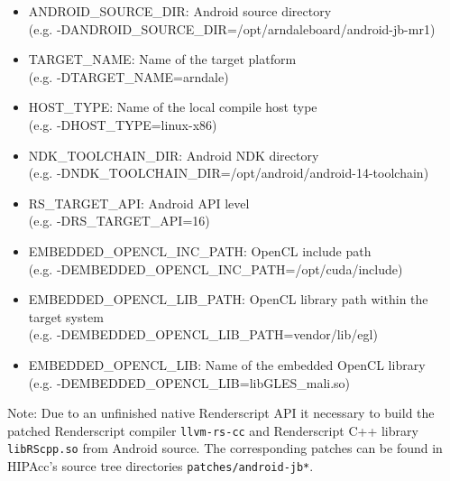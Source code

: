 \begin{itemize}
    \item ANDROID\_SOURCE\_DIR:         Android source directory\\(e.g. -DANDROID\_SOURCE\_DIR=/opt/arndaleboard/android-jb-mr1)
    \item TARGET\_NAME:                 Name of the target platform\\(e.g. -DTARGET\_NAME=arndale)
    \item HOST\_TYPE:                   Name of the local compile host type\\(e.g. -DHOST\_TYPE=linux-x86)
    \item NDK\_TOOLCHAIN\_DIR:          Android NDK directory\\(e.g. -DNDK\_TOOLCHAIN\_DIR=/opt/android/android-14-toolchain)
    \item RS\_TARGET\_API:              Android API level\\(e.g. -DRS\_TARGET\_API=16)
    \item EMBEDDED\_OPENCL\_INC\_PATH:  OpenCL include path\\(e.g. -DEMBEDDED\_OPENCL\_INC\_PATH=/opt/cuda/include)
    \item EMBEDDED\_OPENCL\_LIB\_PATH:  OpenCL library path within the target system\\(e.g. -DEMBEDDED\_OPENCL\_LIB\_PATH=vendor/lib/egl)
    \item EMBEDDED\_OPENCL\_LIB:        Name of the embedded OpenCL library\\(e.g. -DEMBEDDED\_OPENCL\_LIB=libGLES\_mali.so)
\end{itemize}

Note: Due to an unfinished native Renderscript API it necessary to build the
patched Renderscript compiler \texttt{llvm-rs-cc} and Renderscript C++ library
\texttt{libRScpp.so} from Android source. The corresponding patches can be found
in \ac{HIPAcc}'s source tree directories \texttt{patches/android-jb*}.
